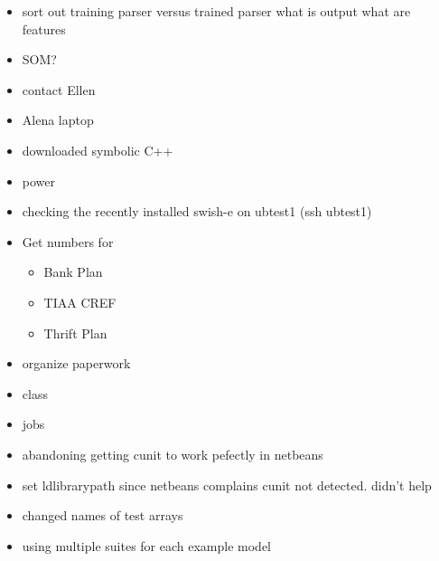 \documentclass[hyperref]{labbook}
\begin{document}
\begin{itemize}
\item sort out training parser versus trained parser  what is output  what are features
\item SOM?
\item contact Ellen
\end{itemize}

\begin{itemize}
\item Alena laptop
\item downloaded symbolic C++
\item power 
\item checking the recently installed swish-e on ubtest1   (ssh ubtest1)  
\end{itemize}

\begin{itemize}
\item Get numbers for 
  \begin{itemize}
  \item Bank Plan
  \item TIAA CREF
  \item Thrift Plan
  \end{itemize}
\item organize paperwork
\end{itemize}

\begin{itemize}
\item class
\item jobs
\end{itemize}



\begin{itemize}
\item abandoning getting cunit to work pefectly in netbeans
  \item  set ldlibrarypath since netbeans complains cunit not detected. didn't help
\item changed names of test arrays
\item using multiple suites for each example model 
\end{itemize}
\end{document}
